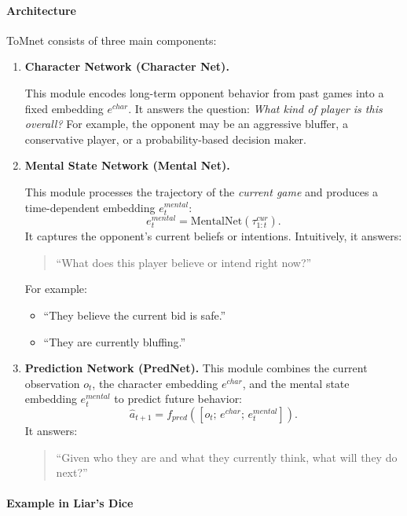 \documentclass{article}
\begin{document}
\paragraph{Architecture}

ToMnet consists of three main components:

\begin{enumerate}
    \item \textbf{Character Network (Character Net).}  
    
    This module encodes long-term opponent behavior from past games into a fixed embedding $e^{char}$. 
    It answers the question: \emph{What kind of player is this overall?}
    For example, the opponent may be an aggressive bluffer, a conservative player, or a probability-based decision maker.

    \item \textbf{Mental State Network (Mental Net).}  
    
    This module processes the trajectory of the \emph{current game} and produces a time-dependent embedding $e^{mental}_t$:
    \[
    e^{mental}_t = \text{MentalNet}(\tau^{cur}_{1:t}).
    \]
    It captures the opponent’s current beliefs or intentions. Intuitively, it answers:
    \begin{quote}
    ``What does this player believe or intend right now?''
    \end{quote}
    For example:
    \begin{itemize}
        \item ``They believe the current bid is safe.''
        \item ``They are currently bluffing.''
    \end{itemize}

    \item \textbf{Prediction Network (PredNet).}  
    This module combines the current observation $o_t$, the character embedding $e^{char}$, and the mental state embedding $e^{mental}_t$ to predict future behavior:
    \[
    \hat{a}_{t+1} = f_{pred}([o_t;\, e^{char};\, e^{mental}_t]).
    \]
    It answers:
    \begin{quote}
    ``Given who they are and what they currently think, what will they do next?''
    \end{quote}
\end{enumerate}

\paragraph{Example in Liar’s Dice}
\end{document}
